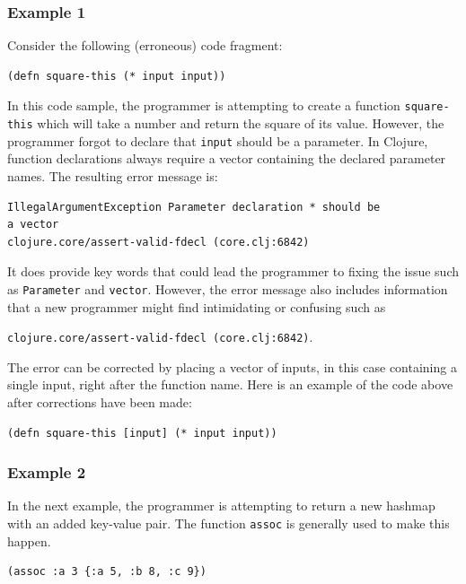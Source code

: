 \documentclass[12pt]{article}
\newcommand{\comment}[1]{{\bf \tt  {#1}}}
\newcommand{\emcomment}[1]{\textcolor{ForestGreen}{\comment{Elena: {#1}}}}
\begin{document}
\subsubsection{Example 1}\label{sec:ex1}

Consider the following (erroneous) code fragment:
\begin{verbatim}
(defn square-this (* input input))
\end{verbatim}

In this code sample, the programmer is attempting to create a function \texttt{square-
this} which will take a number and return the square of its value.
However, the programmer forgot to declare that \texttt{input} should be a parameter.
In Clojure, function declarations always require a vector containing the declared 
parameter names.
The resulting error message is: 
\begin{verbatim}
IllegalArgumentException Parameter declaration * should be 
a vector 
clojure.core/assert-valid-fdecl (core.clj:6842)
\end{verbatim}
It does provide key words that could lead the programmer to fixing the issue such as 
\texttt{Parameter} and \texttt{vector}.
However, the error message also includes information that a new programmer might find 
intimidating or confusing such as 

\noindent
\texttt{clojure.core/assert-valid-fdecl (core.clj:6842)}.



The error can be corrected by placing a vector of inputs, in this case containing a 
single input, right after the function name.
Here is an example of the code above after corrections have been made:
\begin{verbatim}
(defn square-this [input] (* input input))
\end{verbatim}

\subsubsection{Example 2}\label{sec:ex2}

In the next example, the programmer is attempting to return a new hashmap with an added 
key-value pair.
The function \texttt{assoc} is generally used to make this happen.
\begin{verbatim}
(assoc :a 3 {:a 5, :b 8, :c 9})
\end{verbatim}
\end{document}
